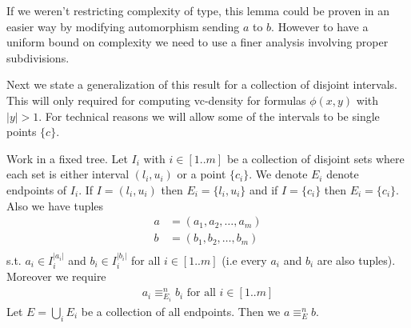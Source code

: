\documentclass{amsart}
\begin{document}
\begin{Note}
	If we weren't restricting complexity of type, this lemma could be proven in an easier way by modifying automorphism sending $a$ to $b$. However to have a uniform bound on complexity we need to use a finer analysis involving proper subdivisions.
\end{Note}

Next we state a generalization of this result for a collection of disjoint intervals. This will only required for computing vc-density for formulas $\phi(x, y)$ with $|y| > 1$. For technical reasons we will allow some of the intervals to be single points $\{c\}$. 
\begin{Corollary} \label{cor_disj_int}
	Work in a fixed tree. Let $I_i$ with $i \in [1..m]$ be a collection of disjoint sets where each set is either interval $(l_i, u_i)$ or a point $\{c_i\}$. We denote $E_i$ denote endpoints of $I_i$. If $I = (l_i, u_i)$ then $E_i = \{l_i, u_i\}$ and if $I = \{c_i\}$ then $E_i = \{c_i\}$. Also we have tuples
	\begin{align*}
		a &= (a_1, a_2, \ldots, a_m) \\
		b &= (b_1, b_2, \ldots, b_m) \\
	\end{align*}
	 s.t. $a_i \in I_i^{|a_i|}$ and $b_i \in I_i^{|b_i|}$ for all $i \in [1..m]$ (i.e every $a_i$ and $b_i$ are also tuples). Moreover we require
	\begin{align*}
		a_i \equiv^n_{E_i} b_i \text{ for all } i \in [1..m]
	\end{align*}
	Let $E = \bigcup_i E_i$ be a collection of all endpoints. Then we $a \equiv^n_E b$.
\end{Corollary}
\end{document}
